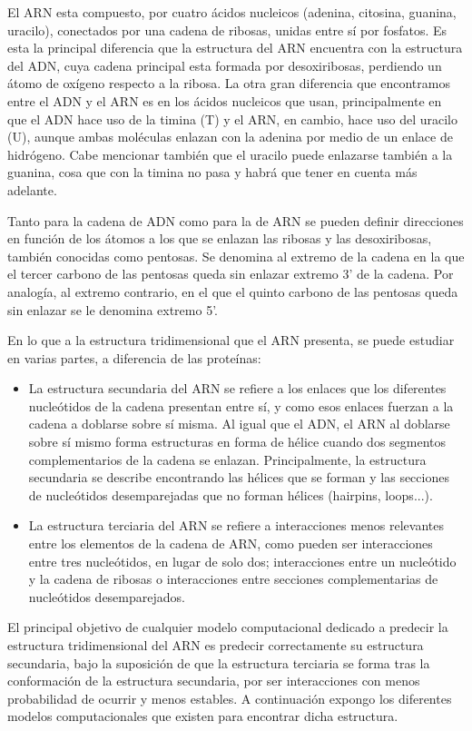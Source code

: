 \documentclass[a4paper,11pt,titlepage]{article}
\theoremstyle{definition}
\begin{document}
El ARN esta compuesto, por cuatro ácidos nucleicos (adenina, citosina, guanina, uracilo), conectados por una cadena de ribosas, unidas entre sí por fosfatos. Es esta la principal diferencia que la estructura del ARN encuentra con la estructura del ADN, cuya cadena principal esta formada por desoxiribosas, perdiendo un átomo de oxígeno respecto a la ribosa. La otra gran diferencia que encontramos entre el ADN y el ARN es en los ácidos nucleicos que usan, principalmente en que el ADN hace uso de la timina (T) y el ARN, en cambio, hace uso del uracilo (U), aunque ambas moléculas enlazan con la adenina por medio de un enlace de hidrógeno. Cabe mencionar también que el uracilo puede enlazarse también a la guanina, cosa que con la timina no pasa y habrá que tener en cuenta más adelante.

Tanto para la cadena de ADN como para la de ARN se pueden definir direcciones en función de los átomos a los que se enlazan las ribosas y las desoxiribosas, también conocidas como pentosas. Se denomina al extremo de la cadena en la que el tercer carbono de las pentosas queda sin enlazar extremo 3' de la cadena. Por analogía, al extremo contrario, en el que el quinto carbono de las pentosas queda sin enlazar se le denomina extremo 5'.

En lo que a la estructura tridimensional que el ARN presenta, se puede estudiar en varias partes, a diferencia de las proteínas:

\begin{itemize}
    \item La estructura secundaria del ARN se refiere a los enlaces que los diferentes nucleótidos de la cadena presentan entre sí, y como esos enlaces fuerzan a la cadena a doblarse sobre sí misma. Al igual que el ADN, el ARN al doblarse sobre sí mismo forma estructuras en forma de hélice cuando dos segmentos complementarios de la cadena se enlazan. Principalmente, la estructura secundaria se describe encontrando las hélices que se forman y las secciones de nucleótidos desemparejadas que no forman hélices (hairpins, loops...).
    \item La estructura terciaria del ARN se refiere a interacciones menos relevantes entre los elementos de la cadena de ARN, como pueden ser interacciones entre tres nucleótidos, en lugar de solo dos; interacciones entre un nucleótido y la cadena de ribosas o interacciones entre secciones complementarias de nucleótidos desemparejados.
\end{itemize}

El principal objetivo de cualquier modelo computacional dedicado a predecir la estructura tridimensional del ARN es predecir correctamente su estructura secundaria, bajo la suposición de que la estructura terciaria se forma tras la conformación de la estructura secundaria, por ser interacciones con menos probabilidad de ocurrir y menos estables. A continuación expongo los diferentes modelos computacionales que existen para encontrar dicha estructura.
\end{document}

